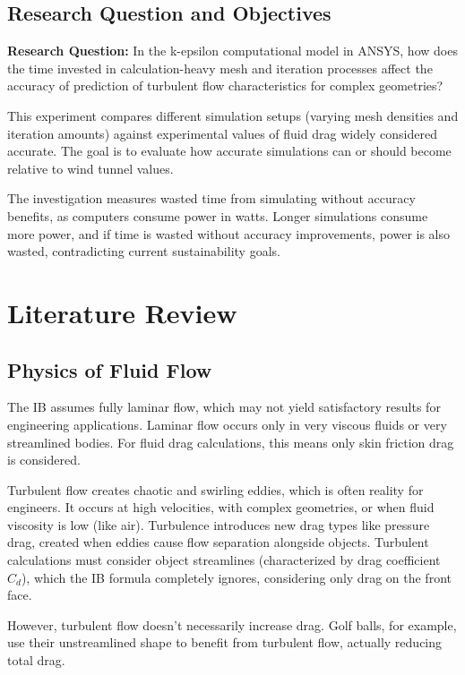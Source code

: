 \documentclass[12pt,a4paper]{article}
\begin{document}
\subsection{Research Question and Objectives}

\textbf{Research Question:} In the k-epsilon computational model in ANSYS, how does the time invested in calculation-heavy mesh and iteration processes affect the accuracy of prediction of turbulent flow characteristics for complex geometries?

This experiment compares different simulation setups (varying mesh densities and iteration amounts) against experimental values of fluid drag widely considered accurate. The goal is to evaluate how accurate simulations can or should become relative to wind tunnel values.

The investigation measures wasted time from simulating without accuracy benefits, as computers consume power in watts. Longer simulations consume more power, and if time is wasted without accuracy improvements, power is also wasted, contradicting current sustainability goals.

\section{Literature Review}

\subsection{Physics of Fluid Flow}

The IB assumes fully laminar flow, which may not yield satisfactory results for engineering applications. Laminar flow occurs only in very viscous fluids or very streamlined bodies. For fluid drag calculations, this means only skin friction drag is considered.

Turbulent flow creates chaotic and swirling eddies, which is often reality for engineers. It occurs at high velocities, with complex geometries, or when fluid viscosity is low (like air). Turbulence introduces new drag types like pressure drag, created when eddies cause flow separation alongside objects. Turbulent calculations must consider object streamlines (characterized by drag coefficient $C_d$), which the IB formula completely ignores, considering only drag on the front face.

However, turbulent flow doesn't necessarily increase drag. Golf balls, for example, use their unstreamlined shape to benefit from turbulent flow, actually reducing total drag.
\end{document}
